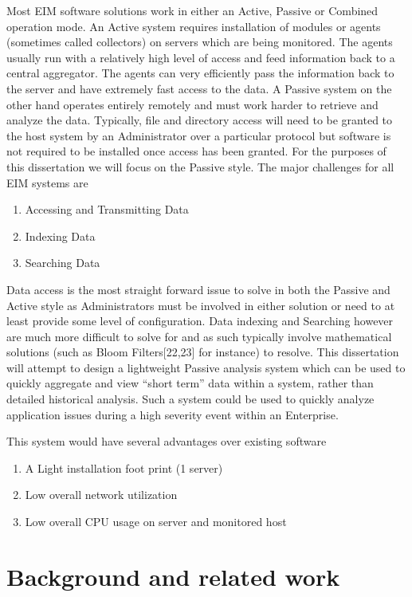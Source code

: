 \documentclass{llncs}
\begin{document}
Most EIM software solutions work in either an Active, Passive or Combined operation mode. An Active system requires installation of modules or agents (sometimes called collectors) on servers which are being monitored. The agents usually run with a relatively high level of access and feed information back to a central aggregator. The agents can very efficiently pass the information back to the server and have extremely fast access to the data. A Passive system on the other hand operates entirely remotely and must work harder to retrieve and analyze the data. Typically, file and directory access will need to be granted to the host system by an Administrator over a particular protocol but software is not required to be installed once access has been granted. For the purposes of this dissertation we will focus on the Passive style. The major challenges for all EIM systems are 

\begin{enumerate}
  \item Accessing and Transmitting Data 
  \item Indexing Data
  \item Searching Data
\end{enumerate}

Data access is the most straight forward issue to solve in both the Passive and Active style as Administrators must be involved in either solution or need to at least provide some level of configuration. Data indexing and Searching however are much more difficult to solve for and as such typically involve mathematical solutions (such as Bloom Filters[22,23] for instance) to resolve. This dissertation will attempt to design a lightweight Passive analysis system which can be used to quickly aggregate and view “short term” data within a system, rather than detailed historical analysis. Such a system could be used to quickly analyze application issues during a high severity event within an Enterprise. 

This system would have several advantages over existing software

\begin{enumerate}
  \item A Light installation foot print (1 server)
  \item Low overall network utilization
  \item Low overall CPU usage on server and monitored host
\end{enumerate}

\section{Background and related work}
\end{document}
